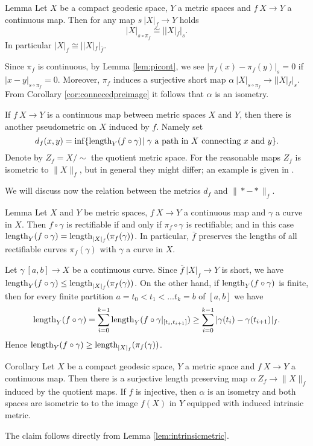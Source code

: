 \documentclass{article}
\begin{document}
\begin{thm}{Lemma}\label{lem:idem}
Let $X$ be a compact geodesic space, $Y$ a metric spaces and $f\:X\to Y$ a continuous map. Then for any map $s\:|X|_f\to Y$ holds
\[|X|_{s\circ\pi_f}\cong||X|_{f}|_s.\]
In particular $|X|_{f}\cong||X|_{f}|_{\bar f}$. %
\end{thm}
 Since $\pi_f$ is continuous, by Lemma \ref{lem:picont}, we see $|\pi_f(x)-\pi_f(y)|_s=0$ if $|x-y|_{s\circ\pi_f}=0$. Moreover,
 $\pi_f$ induces a surjective short map $\alpha\:|X|_{s\circ\pi_f}\to||X|_{f}|_s$. From Corollary \ref{cor:connecedpreimage} it follows that
 $\alpha$ is an isometry.
\qeds

If $f\:X\to Y$ is a continuous map between metric spaces $X$ and $Y$, then there is another pseudometric on $X$ induced by $f$. 
Namely set 
\[d_f(x,y)=\inf\{\mathop{\rm length}\nolimits_Y(f\circ\gamma)|\ \gamma \text{ a path in } X\text{ connecting }x\text{ and }y\}.\]
Denote by $Z_f=X/\sim$ the quotient metric space. 
For the reasonable maps $Z_f$ is isometric to $\|X\|_f$,
but in general they might differ;
an example is given in \cite[4.2]{petrunin-intrinisic}.

We will discuss now the relation between the metrics $d_f$ and $\|*-*\|_f$.


\begin{thm}{Lemma}\label{lem:intrinsicmetric}
Let $X$ and $Y$ be metric spaces, $f\:X\to Y$ a continuous map and $\gamma$ a curve in $X$. Then $f\circ\gamma$
is rectifiable if and only if $\pi_f\circ\gamma$ is rectifiable; and in this case $\mathop{\rm length}\nolimits_Y(f\circ\gamma)=\mathop{\rm length}\nolimits_{|X|_f}(\pi_f(\gamma))$.
In particular, $\bar f$ preserves the lengths of all rectifiable curves $\pi_f(\gamma)$ with $\gamma$ a curve in $X$.
\end{thm}
Let $\gamma\:[a,b]\to X$ be a continuous curve.
Since $\bar f\:|X|_f\to Y$ is short, we have $\mathop{\rm length}\nolimits_Y(f\circ \gamma)\leq\mathop{\rm length}\nolimits_{|X|_f}(\pi_f(\gamma))$. On the other hand,
if $\mathop{\rm length}\nolimits_Y(f\circ \gamma)$ is finite, then for every finite partition ${a=t_0<t_1<\ldots t_k=b}$ of $[a,b]$ we have
\[\mathop{\rm length}\nolimits_Y(f\circ \gamma)=\sum_{i=0}^{k-1}\mathop{\rm length}\nolimits_Y(f\circ \gamma|_{[t_i,t_{i+1}]})\geq\sum_{i=0}^{k-1}|\gamma(t_i)-\gamma(t_{i+1})|_f.\]
Hence $\mathop{\rm length}\nolimits_Y(f\circ \gamma)\geq\mathop{\rm length}\nolimits_{|X|_f}(\pi_f(\gamma))$.
\qeds

\begin{thm}{Corollary}\label{cor:reltolengthmetric}
Let $X$ be a compact geodesic space, $Y$ a metric space and $f\:X\to Y$ a continuous map. Then there is a surjective length preserving map
$\alpha\:Z_f\to\|X\|_f$ induced by the quotient maps. 
If $f$ is injective, then $\alpha$ is an isometry and both spaces are isometric to
to the image $f(X)$ in $Y$ equipped with induced intrinsic metric.
\end{thm}
The claim follows directly from Lemma \ref{lem:intrinsicmetric}.
\qeds
\end{document}
